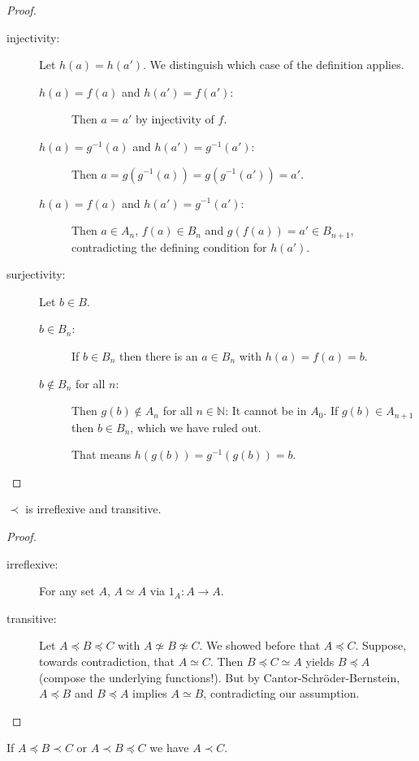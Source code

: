 \documentclass{whrartcl}
\newcommand{\NN}{\mathbb{N}}
\begin{document}
\begin{proof}
  \begin{description}
  \item[injectivity:] Let $h(a) = h(a')$. We distinguish which case of the
    definition applies.
    \begin{description}
    \item[$h(a) = f(a)$ and $h(a') = f(a')$:] Then $a = a'$ by injectivity of $f$.
    \item[$h(a) = g^{-1}(a)$ and $h(a') = g^{-1}(a')$:] Then $a = g(g^{-1}(a)) =
      g(g^{-1}(a')) = a'$.
    \item[$h(a) = f(a)$ and $h(a') = g^{-1}(a')$:] Then $a \in A_n$, $f(a) \in
      B_n$ and $g(f(a)) = a' \in B_{n+1}$, contradicting the defining condition
      for $h(a')$.
    \end{description}
  \item[surjectivity:] Let $b \in B$.
    \begin{description}
    \item[$b \in B_n$:] If $b \in B_n$ then there is an $a \in B_n$ with $h(a) = f(a) = b$.
    \item[$b \not\in B_n$ for all $n$:] Then $g(b) \not\in A_n$ for all $n \in
      \NN$: It cannot be in $A_0$. If $g(b) \in A_{n + 1}$ then $b \in B_n$,
      which we have ruled out.

      That means $h(g(b)) = g^{-1}(g(b)) = b$.
    \end{description}
  \end{description}
\end{proof}

\begin{lemma}
  $\prec$ is irreflexive and transitive.
\end{lemma}
\begin{proof}
  \
  \begin{description}
  \item[irreflexive:] For any set $A$, $A \simeq A$ via $1_A : A \to A$.
  \item[transitive:] Let $A \preceq B \preceq C$ with $A \not\simeq B \not\simeq
    C$. We showed before that $A \preceq C$. Suppose, towards contradiction,
    that $A \simeq C$. Then $B \preceq C \simeq A$ yields $B \preceq A$ (compose
    the underlying functions!). But by Cantor-Schröder-Bernstein, $A \preceq B$
    and $B \preceq A$ implies $A \simeq B$, contradicting our assumption.
  \end{description}
\end{proof}

\begin{corollary}
  If $A \preceq B \prec C$ or $A \prec B \preceq C$ we have $A \prec C$.
\end{corollary}
\end{document}
